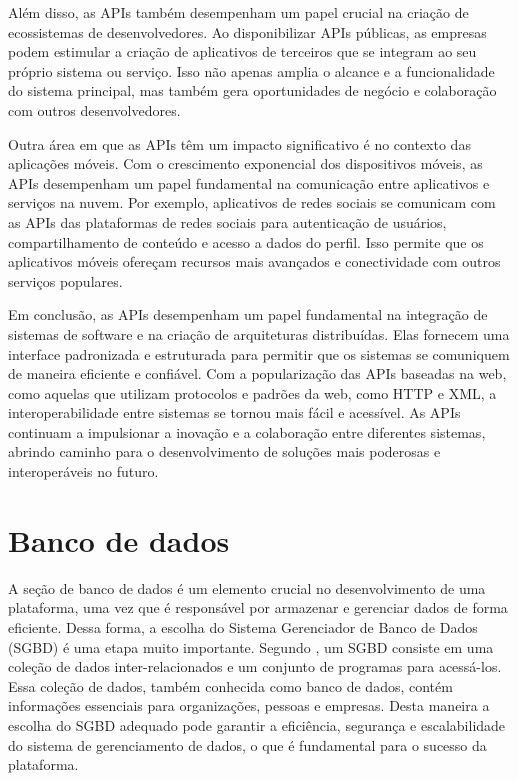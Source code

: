 \documentclass[tcc,capa]{texufpel}
\begin{document}
Além disso, as APIs também desempenham um papel crucial na criação de ecossistemas de desenvolvedores. Ao disponibilizar APIs públicas, as empresas podem estimular a criação de aplicativos de terceiros que se integram ao seu próprio sistema ou serviço. Isso não apenas amplia o alcance e a funcionalidade do sistema principal, mas também gera oportunidades de negócio e colaboração com outros desenvolvedores.

Outra área em que as APIs têm um impacto significativo é no contexto das aplicações móveis. Com o crescimento exponencial dos dispositivos móveis, as APIs desempenham um papel fundamental na comunicação entre aplicativos e serviços na nuvem. Por exemplo, aplicativos de redes sociais se comunicam com as APIs das plataformas de redes sociais para autenticação de usuários, compartilhamento de conteúdo e acesso a dados do perfil. Isso permite que os aplicativos móveis ofereçam recursos mais avançados e conectividade com outros serviços populares.

Em conclusão, as APIs desempenham um papel fundamental na integração de sistemas de software e na criação de arquiteturas distribuídas. Elas fornecem uma interface padronizada e estruturada para permitir que os sistemas se comuniquem de maneira eficiente e confiável. Com a popularização das APIs baseadas na web, como aquelas que utilizam protocolos e padrões da web, como HTTP e XML, a interoperabilidade entre sistemas se tornou mais fácil e acessível. As APIs continuam a impulsionar a inovação e a colaboração entre diferentes sistemas, abrindo caminho para o desenvolvimento de soluções mais poderosas e interoperáveis no futuro.


\section{Banco de dados}
A seção de banco de dados é um elemento crucial no desenvolvimento de uma plataforma, uma vez que é responsável por armazenar e gerenciar dados de forma eficiente. Dessa forma, a escolha do Sistema Gerenciador de Banco de Dados (SGBD) é uma etapa muito importante. Segundo \citet{Silberschatz:2010}, um SGBD consiste em uma coleção de dados inter-relacionados e um conjunto de programas para acessá-los. Essa coleção de dados, também conhecida como banco de dados, contém informações essenciais para organizações, pessoas e empresas. Desta maneira a escolha do SGBD adequado pode garantir a eficiência, segurança e escalabilidade do sistema de gerenciamento de dados, o que é fundamental para o sucesso da plataforma.
\end{document}

